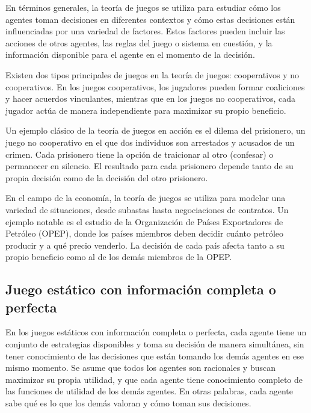 En términos generales, la teoría de juegos se utiliza para estudiar cómo los agentes toman decisiones en diferentes contextos y cómo estas decisiones están influenciadas por una variedad de factores. Estos factores pueden incluir las acciones de otros agentes, las reglas del juego o sistema en cuestión, y la información disponible para el agente en el momento de la decisión.
\vspace{2.5mm}

Existen dos tipos principales de juegos en la teoría de juegos: cooperativos y no cooperativos. En los juegos cooperativos, los jugadores pueden formar coaliciones y hacer acuerdos vinculantes, mientras que en los juegos no cooperativos, cada jugador actúa de manera independiente para maximizar su propio beneficio.
\vspace{2.5mm}

Un ejemplo clásico de la teoría de juegos en acción es el dilema del prisionero, un juego no cooperativo en el que dos individuos son arrestados y acusados de un crimen. Cada prisionero tiene la opción de traicionar al otro (confesar) o permanecer en silencio. El resultado para cada prisionero depende tanto de su propia decisión como de la decisión del otro prisionero.
\vspace{2.5mm}

En el campo de la economía, la teoría de juegos se utiliza para modelar una variedad de situaciones, desde subastas hasta negociaciones de contratos. Un ejemplo notable es el estudio de la Organización de Países Exportadores de Petróleo (OPEP), donde los países miembros deben decidir cuánto petróleo producir y a qué precio venderlo. La decisión de cada país afecta tanto a su propio beneficio como al de los demás miembros de la OPEP.
\vspace{2.5mm}

\subsection{Juego estático con información completa o perfecta}\label{C261}
En los juegos estáticos con información completa o perfecta, cada agente tiene un conjunto de estrategias disponibles y toma su decisión de manera simultánea, sin tener conocimiento de las decisiones que están tomando los demás agentes en ese mismo momento. Se asume que todos los agentes son racionales y buscan maximizar su propia utilidad, y que cada agente tiene conocimiento completo de las funciones de utilidad de los demás agentes. En otras palabras, cada agente sabe qué es lo que los demás valoran y cómo toman sus decisiones.
\vspace{2.5mm}


